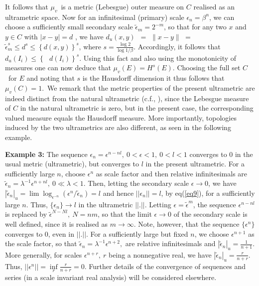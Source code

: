 \documentclass[12pt]{article}
\begin{document}
\vspace{.25cm}

It follows that $\mu _{v}$\ is a metric (Lebesgue) outer measure on $C$
realised as an ultrametric space. Now for an infinitesimal (primary) scale $%
\epsilon _{n}=\beta^{n}$, we can choose a sufficiently small secondary scale $%
\tilde{\epsilon}_{m}=2^{-m}$, so that for any two $x$ and $y\in C$ with $%
\mid x-y\mid =d$ , we have $d_{u}(x,y)$\ $=$ $\parallel x-y\parallel $ $=$ $%
\tilde\epsilon _{m}^{s}\leq d^{s}\leq \left\{ d(x,y)\right\} ^{s}$, where $s=\frac{\log 2}{\log 1/\beta}$.  Accordingly,
it follows that $d_{u}(I_{i})\leq \left\{ \text{ }d(I_{i})\right\} ^{s}.$
Using this fact and also using the monotonicity of measures one can now
deduce that $\mu _{v}(E)=H^{s}(E)$. Choosing the full set $C$\ for $E$ and
noting that $s$ is the Hausdorff dimension it thus follows that $\mu
_{v}(C)=1.$\ We remark that the metric properties of the present 
ultrametric are indeed distinct from the
natural ultrametric  (c.f., \cite{sd1, sd2}), since the Lebesgue measure of $C$ in the natural ultrametric
is zero, but in the present case, the corresponding valued measure equals
the Hausdorff measure. More importantly, topologies induced by the two ultrametrics 
are also different, as seen in the following example.

\vspace{.25cm}

{\bf Example 3:} The sequence $\epsilon_n=\epsilon^{n-nl}, \ 0<\epsilon<1, \ 0<l<1$ converges to 0 in the usual metric (ultrametric), but converges to $l$ in the present ultrametric. For a sufficiently large $n$, choose $\epsilon^n$ as scale factor  and then relative infinitesimals  are $\tilde\epsilon_n= \lambda^{-1}\epsilon^{n+nl}, \ 0\ll\lambda<1$. Then, letting the secondary scale $\epsilon \rightarrow 0$, we have $|\tilde \epsilon_n|_u=\lim \log_{\epsilon^{-n}}(\epsilon^n/\tilde \epsilon_n) = l$ and hence $||\epsilon_n||=l$, by eq(\ref{eq9}), for a sufficiently large $n$. Thus, $\{\epsilon_n\} \rightarrow l$ in the ultrametric $||.||$. Letting $\epsilon={\tilde \epsilon}^{m}$, the sequence $\epsilon^{n-nl}$ is replaced by ${\tilde\epsilon}^{N-Nl}, \ N=nm $, so that the limit $\epsilon \rightarrow 0$ of the secondary scale is well defined, since it is realised as $m\rightarrow \infty$.
Note, however, that the sequence $\{\epsilon^n\}$ converges to 0, even in  $||.||$. For a sufficiently large but fixed $n$, we choose $\epsilon^{n+1}$ as the scale factor, so that $\tilde\epsilon_n=\lambda^{-1}\epsilon^{n+2},$ are relative infinitesimals and $|\tilde\epsilon_n|_u={\frac{1}{n+1}}$. More generally, for scales $\epsilon^{n+r}, \ r$ being a nonnegative real, we have  $|\tilde\epsilon_n|_u= {\frac{r}{n+r}}$. Thus, $||\epsilon^n||=\underset{r}{\inf}{\frac{r}{n+r}} = 0$. Further details of the convergence of  sequences and series (in a scale invariant real analysis) will be considered elsewhere.
\end{document}
